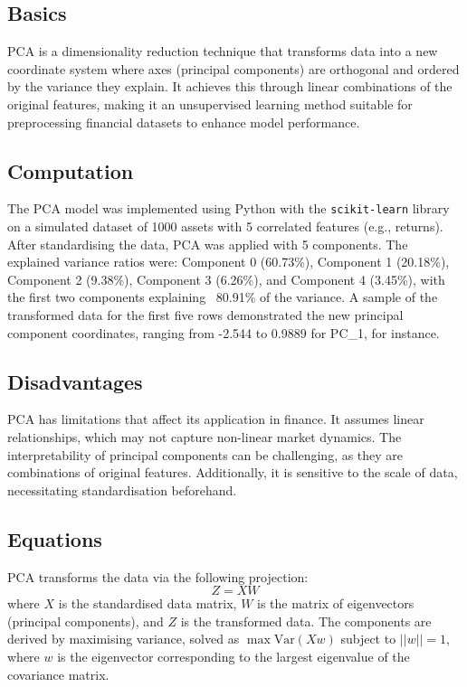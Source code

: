 \documentclass{article}
\begin{document}
\subsection{Basics}
PCA is a dimensionality reduction technique that transforms data into a new coordinate system where axes (principal components) are orthogonal and ordered by the variance they explain. It achieves this through linear combinations of the original features, making it an unsupervised learning method suitable for preprocessing financial datasets to enhance model performance.

\subsection{Computation}
The PCA model was implemented using Python with the \texttt{scikit-learn} library on a simulated dataset of 1000 assets with 5 correlated features (e.g., returns). After standardising the data, PCA was applied with 5 components. The explained variance ratios were: Component 0 (60.73\%), Component 1 (20.18\%), Component 2 (9.38\%), Component 3 (6.26\%), and Component 4 (3.45\%), with the first two components explaining ~80.91\% of the variance. A sample of the transformed data for the first five rows demonstrated the new principal component coordinates, ranging from -2.544 to 0.9889 for PC\_1, for instance.

\subsection{Disadvantages}
PCA has limitations that affect its application in finance. It assumes linear relationships, which may not capture non-linear market dynamics. The interpretability of principal components can be challenging, as they are combinations of original features. Additionally, it is sensitive to the scale of data, necessitating standardisation beforehand.

\subsection{Equations}
PCA transforms the data via the following projection:
\[
Z = X W
\]
where \(X\) is the standardised data matrix, \(W\) is the matrix of eigenvectors (principal components), and \(Z\) is the transformed data. The components are derived by maximising variance, solved as \(\max \text{Var}(X w)\) subject to \(||w|| = 1\), where \(w\) is the eigenvector corresponding to the largest eigenvalue of the covariance matrix.
\end{document}
